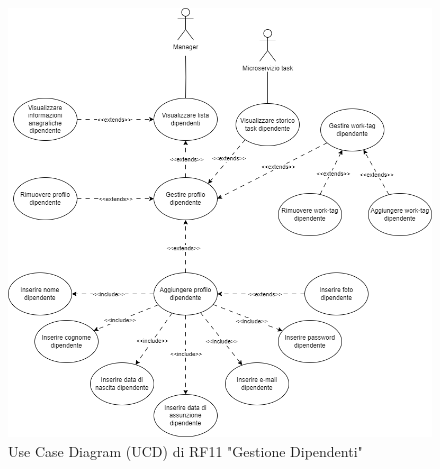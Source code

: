 \documentclass{report}
\begin{document}
\begin{figure}[H]
	\centering\includegraphics[width=1\textwidth]{images/UCD/RF11_gestionedipendenti_UCD.png}
	Use Case Diagram (UCD) di RF11 "Gestione Dipendenti"
\end{figure}
\end{document}
